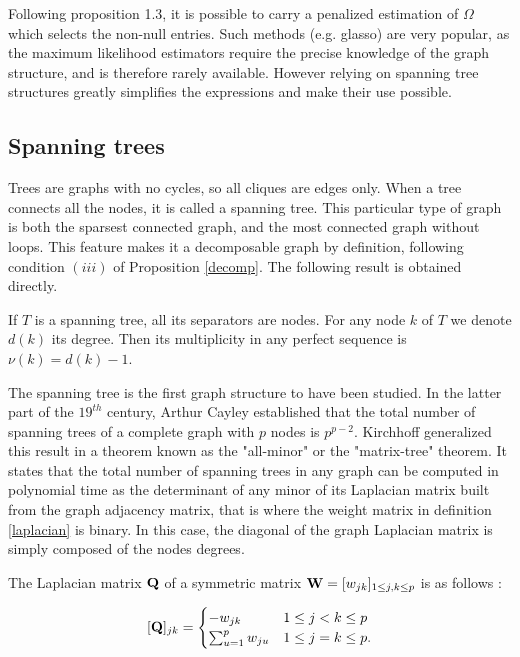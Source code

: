  Following proposition 1.3, it is possible to carry a penalized estimation of $\Omega$ which selects the non-null entries.  Such methods (e.g. glasso) are very popular, as the maximum likelihood estimators require the precise knowledge of the graph structure, and is therefore rarely available. However relying on spanning tree structures greatly simplifies the expressions and make their use possible.
 
\subsection{Spanning trees}
Trees are graphs with no cycles, so all cliques are edges only. When a tree connects all the nodes, it is called a spanning tree. This particular type of graph is both the sparsest connected graph, and the most connected graph without loops. This feature makes it a decomposable graph by definition, following condition $(iii)$ of Proposition \ref{decomp}.  The following result is obtained directly.

\begin{prop}
If $T$ is a spanning tree, all its separators are nodes. For any node $k$ of $T$ we denote $d(k)$ its degree. Then its multiplicity in any perfect sequence is $\nu(k) = d(k)-1$.
\end{prop}
 
 
 The spanning tree is the first graph structure to have been studied. In the latter part of the $19^{th}$ century, Arthur Cayley established that the total number of spanning trees of a complete graph with $p$ nodes is $p^{p-2}$. Kirchhoff generalized this result in a theorem known as the "all-minor" or the "matrix-tree" theorem. It states that the total number of spanning trees in any graph can be computed in polynomial time as the determinant of any minor of its Laplacian matrix built from the graph adjacency matrix, that is where the weight matrix in definition \ref{laplacian} is binary. In this case, the diagonal of the graph Laplacian matrix is simply composed of the nodes degrees.
 
 \begin{definition}
 \label{laplacian}
 The Laplacian matrix ${\bf Q}$ of a symmetric matrix ${\bf W}=[w_{jk} ]_{1\leq j,k\leq p}$ is as follows :

\[
 [{\bf Q}]_{jk}  =\begin{cases}
    -w_{jk}  & 1\leq j<k \leq p\\
    \sum_{u=1}^p w_{ju} & 1\leq j=k \leq p.
    \end{cases}
\]
 \end{definition}
 
